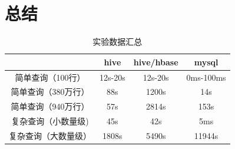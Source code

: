 \section{总结}

\begin{table}[!h]
\arrayrulewidth=1pt
\centering
{\Large
\begin{tabular}{|c|c|c|c|}\hline
\rowcolor{gray!50} & hive & hive/hbase & mysql \\\hline
\rowcolor{green!60}简单查询（100行） & 12s-20s & 12s-20s & 0ms-100ms \\\hline
\rowcolor{green!20} 简单查询（380万行） & 88s & 1200s  & 14s \\\hline
\rowcolor{green!60} 简单查询（940万行） & 57s & 2814s & 153s \\\hline
\rowcolor{green!20} 复杂查询（小数量级) & 45s & 42s & 5ms \\\hline
\rowcolor{green!60} 复杂查询（大数量级） & 1808s & 5490s & 11944s \\\hline
\end{tabular}
}
\caption{实验数据汇总}
\end{table}

